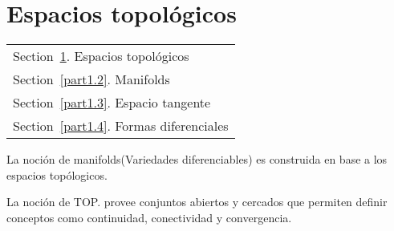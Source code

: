 \documentclass[../main]{subfiles}
\begin{document}
\section{Espacios topológicos}\label{part1.1}
        \begin{margintable}\vspace{.8in}\footnotesize
		\begin{tabularx}{\marginparwidth}{|X}
		Section~\ref{part1.1}. Espacios topológicos\\
            Section~\ref{part1.2}. Manifolds \\
            Section~\ref{part1.3}. Espacio tangente\\
            Section~\ref{part1.4}. Formas diferenciales\\
		\end{tabularx}
	\end{margintable}

La noción de manifolds(Variedades diferenciables) es construida en base a los espacios topólogicos.

La noción de TOP. provee conjuntos abiertos y cercados que permiten definir conceptos como continuidad, conectividad y convergencia.

\end{document}
